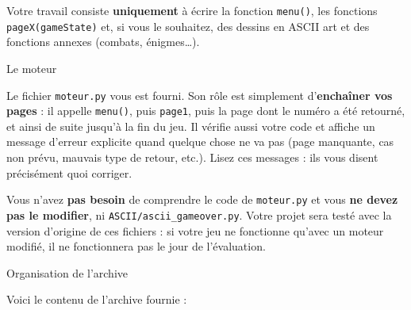 \documentclass[11pt,a4paper]{article}
\makeatletter
\renewcommand\section{\@startsection{section}{1}{0pt}{1.6em}{0.8em}%
  {\Large\bfseries\color{nuit}}}
\newcommand{\fichier}[1]{\texttt{\color{nuit}#1}}
\makeatother
\begin{document}
Votre travail consiste \textbf{uniquement} à écrire la fonction \texttt{menu()}, les
fonctions \texttt{pageX(gameState)} et, si vous le souhaitez, des dessins en ASCII art et
des fonctions annexes (combats, énigmes\dots).

\section{Le moteur}

Le fichier \fichier{moteur.py} vous est fourni. Son rôle est simplement
d'\textbf{enchaîner vos pages} : il appelle \texttt{menu()}, puis \texttt{page1}, puis la
page dont le numéro a été retourné, et ainsi de suite jusqu'à la fin du jeu. Il vérifie
aussi votre code et affiche un message d'erreur explicite quand quelque chose ne va pas
(page manquante, cas non prévu, mauvais type de retour, etc.). Lisez ces messages : ils vous disent
précisément quoi corriger.

\begin{attention}
Vous n'avez \textbf{pas besoin} de comprendre le code de \fichier{moteur.py} et vous
\textbf{ne devez pas le modifier}, ni \fichier{ASCII/ascii\_gameover.py}.
Votre projet sera testé avec la version d'origine de ces fichiers : si votre jeu ne
fonctionne qu'avec un moteur modifié, il ne fonctionnera pas le jour de l'évaluation.
\end{attention}

\newpage
\section{Organisation de l'archive}

Voici le contenu de l'archive fournie :
\end{document}
